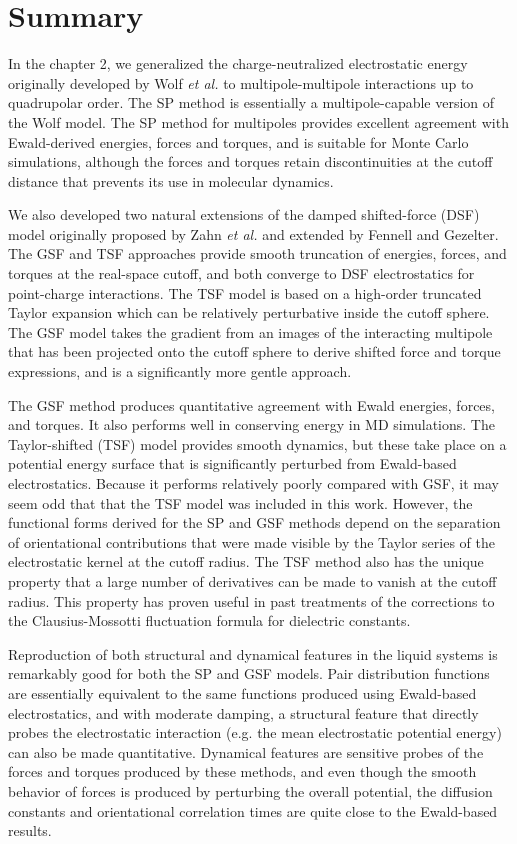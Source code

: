 \section{Summary}
In the chapter 2, we generalized the
charge-neutralized electrostatic energy originally developed by Wolf
\textit{et al.}\cite{Wolf99} to multipole-multipole interactions
up to quadrupolar order.  The SP method is essentially a
multipole-capable version of the Wolf model.  The SP method for
multipoles provides excellent agreement with Ewald-derived energies,
forces and torques, and is suitable for Monte Carlo simulations,
although the forces and torques retain discontinuities at the cutoff
distance that prevents its use in molecular dynamics.

We also developed two natural extensions of the damped shifted-force
(DSF) model originally proposed by Zahn {\it et al.} and extended by
Fennell and Gezelter.\cite{Zahn02, Gezelter06} The GSF and TSF
approaches provide smooth truncation of energies, forces, and torques
at the real-space cutoff, and both converge to DSF electrostatics for
point-charge interactions.  The TSF model is based on a high-order
truncated Taylor expansion which can be relatively perturbative inside
the cutoff sphere.  The GSF model takes the gradient from an images of
the interacting multipole that has been projected onto the cutoff
sphere to derive shifted force and torque expressions, and is a
significantly more gentle approach.

The GSF method produces quantitative agreement with Ewald energies,
forces, and torques.  It also performs well in conserving energy in MD
simulations.  The Taylor-shifted (TSF) model provides smooth dynamics,
but these take place on a potential energy surface that is
significantly perturbed from Ewald-based electrostatics.  Because it
performs relatively poorly compared with GSF, it may seem odd that
that the TSF model was included in this work.  However, the functional
forms derived for the SP and GSF methods depend on the separation of
orientational contributions that were made visible by the Taylor
series of the electrostatic kernel at the cutoff radius. The TSF
method also has the unique property that a large number of derivatives
can be made to vanish at the cutoff radius.  This property has proven
useful in past treatments of the corrections to the Clausius-Mossotti
fluctuation formula for dielectric constants.\cite{Izvekov08}

Reproduction of both structural and dynamical features in the liquid
systems is remarkably good for both the SP and GSF models.  Pair
distribution functions are essentially equivalent to the same
functions produced using Ewald-based electrostatics, and with moderate
damping, a structural feature that directly probes the electrostatic
interaction (e.g. the mean electrostatic potential energy) can also be
made quantitative.  Dynamical features are sensitive probes of the
forces and torques produced by these methods, and even though the
smooth behavior of forces is produced by perturbing the overall
potential, the diffusion constants and orientational correlation times
are quite close to the Ewald-based results.

